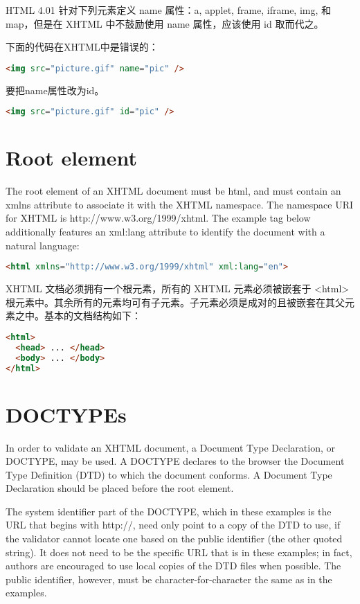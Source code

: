 HTML 4.01 针对下列元素定义 name 属性：a, applet, frame, iframe, img, 和map，但是在 XHTML 中不鼓励使用 name 属性，应该使用 id 取而代之。

下面的代码在XHTML中是错误的：

\begin{lstlisting}[language=HTML]
<img src="picture.gif" name="pic" />
\end{lstlisting}

要把name属性改为id。

\begin{lstlisting}[language=HTML]
<img src="picture.gif" id="pic" />
\end{lstlisting}


\section{Root element}

The root element of an XHTML document must be html, and must contain an xmlns attribute to associate it with the XHTML namespace. The namespace URI for XHTML is http://www.w3.org/1999/xhtml. The example tag below additionally features an xml:lang attribute to identify the document with a natural language:

\begin{lstlisting}[language=HTML]
<html xmlns="http://www.w3.org/1999/xhtml" xml:lang="en">
\end{lstlisting}

XHTML 文档必须拥有一个根元素，所有的 XHTML 元素必须被嵌套于 <html> 根元素中。其余所有的元素均可有子元素。子元素必须是成对的且被嵌套在其父元素之中。基本的文档结构如下：

\begin{lstlisting}[language=HTML]
<html>
  <head> ... </head>
  <body> ... </body>
</html>
\end{lstlisting}


\section{DOCTYPEs}

In order to validate an XHTML document, a Document Type Declaration, or DOCTYPE, may be used. A DOCTYPE declares to the browser the Document Type Definition (DTD) to which the document conforms. A Document Type Declaration should be placed before the root element.

The system identifier part of the DOCTYPE, which in these examples is the URL that begins with http://, need only point to a copy of the DTD to use, if the validator cannot locate one based on the public identifier (the other quoted string). It does not need to be the specific URL that is in these examples; in fact, authors are encouraged to use local copies of the DTD files when possible. The public identifier, however, must be character-for-character the same as in the examples.

